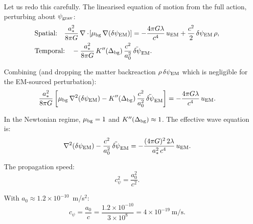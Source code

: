 \documentclass[11pt]{article}
\newcommand{\ee}[1]{\times 10^{#1}}
\newcommand{\psigrav}{\psi_{\rm grav}}
\newcommand{\dpsiEM}{\delta\psi_{\rm EM}}
\theoremstyle{definition}
\theoremstyle{remark}
\begin{document}
Let us redo this carefully. The linearised equation of motion from
the full action, perturbing about $\psigrav$:
\begin{align}
&\text{Spatial:}\quad
\frac{a_*^2}{8\pi G}\,\nabla\cdot\!\left[
  \mu_{\rm bg}\,\nabla(\dpsiEM)\right]
= -\frac{4\pi G\lambda}{c^4}\,u_{\rm EM}
+ \frac{c^2}{2}\,\dpsiEM\,\rho,
\label{eq:spatial-lin}\\
&\text{Temporal:}\quad
-\frac{a_*^2}{8\pi G}\,K''(\Delta_{\rm bg})\,
\frac{c^2}{a_0^2}\,\ddot{\delta\psi}_{\rm EM}.
\label{eq:temporal-lin}
\end{align}

Combining (and dropping the matter backreaction $\rho\,\dpsiEM$
which is negligible for the EM-sourced perturbation):
\begin{equation}
\frac{a_*^2}{8\pi G}\left[
  \mu_{\rm bg}\,\nabla^2(\dpsiEM)
  - K''(\Delta_{\rm bg})\,\frac{c^2}{a_0^2}\,
  \ddot{\delta\psi}_{\rm EM}
\right]
= -\frac{4\pi G\lambda}{c^4}\,u_{\rm EM}.
\label{eq:combined-lin}
\end{equation}

In the Newtonian regime, $\mu_{\rm bg} = 1$ and
$K''(\Delta_{\rm bg}) \approx 1$. The effective wave equation is:
\begin{equation}
\nabla^2(\dpsiEM)
- \frac{c^2}{a_0^2}\,\ddot{\delta\psi}_{\rm EM}
= -\frac{(4\pi G)^2\,2\lambda}{a_*^2\,c^4}\,u_{\rm EM}.
\label{eq:wave-dpsi}
\end{equation}

The propagation speed:
\begin{equation}
c_\psi^2 = \frac{a_0^2}{c^2}.
\end{equation}

With $a_0 \approx 1.2\ee{-10}$~m/s$^2$:
\begin{equation}
c_\psi = \frac{a_0}{c} = \frac{1.2\ee{-10}}{3\ee{8}}
= 4\ee{-19}~\text{m/s}.
\label{eq:cpsi-value}
\end{equation}
\end{document}

